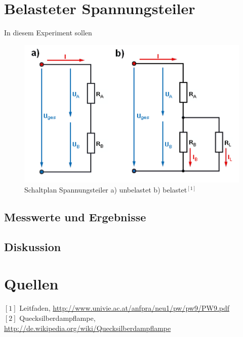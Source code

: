 \documentclass[12pt,a4paper]{article}
\begin{document}
\begin{multicols}{2}

\section{Belasteter Spannungsteiler}
In diesem Experiment sollen 
\begin{figure}[H]
	\centering
	\includegraphics[scale=0.4]{./figure/spannungsteiler_schaltplan.png}
	\caption{Schaltplan Spannungsteiler a) unbelastet b) belastet$^{[1]}$}
	\label{fig:schaltbild_solarzelle}
\end{figure}
\noindent

\subsection{Messwerte und Ergebnisse}



\subsection{Diskussion}



\section{Quellen}
$[1]$ Leitfaden, \url{http://www.univie.ac.at/anfpra/neu1/pw/pw9/PW9.pdf}\\
$[2]$ Quecksilberdampflampe, \url{http://de.wikipedia.org/wiki/Quecksilberdampflampe}\\

\end{multicols}
\end{document}
